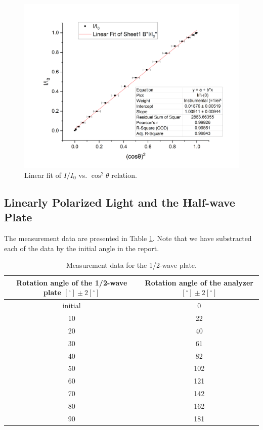 \documentclass{article}
\begin{document}
\begin{figure}[H]\centering
\includegraphics[scale=0.5]{1.png}
\caption{Linear fit of $I/I_0$ vs. $\cos^2\theta$ relation.}\label{FigCI}
\end{figure}


\subsection{Linearly Polarized Light and the Half-wave Plate}

The measurement data are presented in Table \ref{Table1/2}. Note that we have substracted each of the data by the initial angle in the report. 

\begin{table}[H]\centering
\begin{tabular}{cc}
\toprule
Rotation angle of the 1/2-wave plate $[^\circ] \pm 2[^\circ]$ & Rotation angle of the analyzer $[^\circ] \pm 2[^\circ]$\\
\midrule 
    initial & 0\\
    10      & 22\\
    20      & 40\\
    30      & 61\\
    40      & 82\\
    50      & 102 \\
    60      & 121 \\
    70      & 142 \\
    80      & 162 \\
    90      & 181 \\
\bottomrule
\end{tabular}
\caption{Measurement data for the 1/2-wave plate.}\label{Table1/2}
\end{table}
\end{document}
